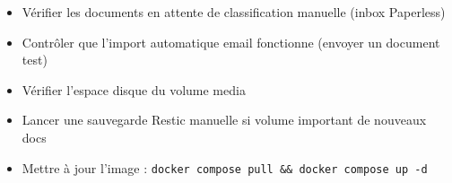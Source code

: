 \documentclass[11pt, a4paper]{article}
\begin{document}
\begin{checklist}
  \begin{itemize}
    \item[$\square$] Vérifier les documents en attente de classification manuelle (inbox Paperless)
    \item[$\square$] Contrôler que l'import automatique email fonctionne (envoyer un document test)
    \item[$\square$] Vérifier l'espace disque du volume media
    \item[$\square$] Lancer une sauvegarde Restic manuelle si volume important de nouveaux docs
    \item[$\square$] Mettre à jour l'image : \texttt{docker compose pull \&\& docker compose up -d}
  \end{itemize}
\end{checklist}
\end{document}
